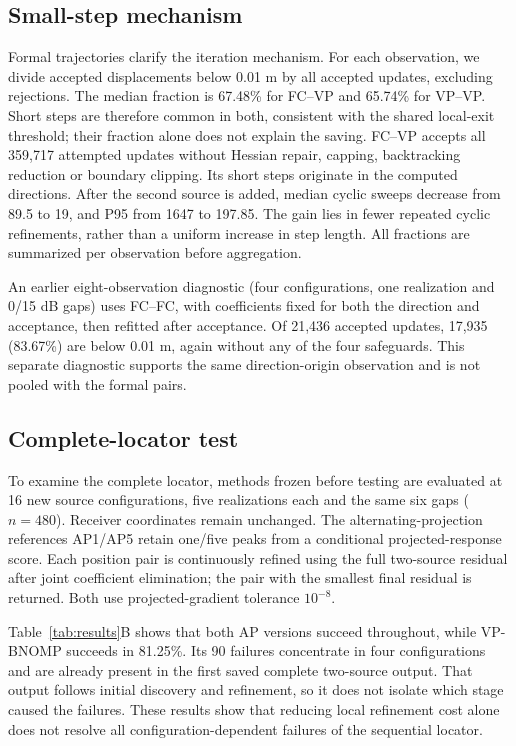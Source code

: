 \documentclass[a4paper,12pt,review]{cas-sc}
\begin{document}
\subsection{Small-step mechanism}
Formal trajectories clarify the iteration mechanism. For each observation, we divide accepted displacements below 0.01 m by all accepted updates, excluding rejections. The median fraction is 67.48\% for FC--VP and 65.74\% for VP--VP. Short steps are therefore common in both, consistent with the shared local-exit threshold; their fraction alone does not explain the saving. FC--VP accepts all 359,717 attempted updates without Hessian repair, capping, backtracking reduction or boundary clipping. Its short steps originate in the computed directions. After the second source is added, median cyclic sweeps decrease from 89.5 to 19, and P95 from 1647 to 197.85. The gain lies in fewer repeated cyclic refinements, rather than a uniform increase in step length. All fractions are summarized per observation before aggregation.

An earlier eight-observation diagnostic (four configurations, one realization and 0/15 dB gaps) uses FC--FC, with coefficients fixed for both the direction and acceptance, then refitted after acceptance. Of 21,436 accepted updates, 17,935 (83.67\%) are below 0.01 m, again without any of the four safeguards. This separate diagnostic supports the same direction-origin observation and is not pooled with the formal pairs.

\FloatBarrier
\subsection{Complete-locator test}
To examine the complete locator, methods frozen before testing are evaluated at 16 new source configurations, five realizations each and the same six gaps ($n=480$). Receiver coordinates remain unchanged. The alternating-projection references AP1/AP5 retain one/five peaks from a conditional projected-response score. Each position pair is continuously refined using the full two-source residual after joint coefficient elimination; the pair with the smallest final residual is returned. Both use projected-gradient tolerance $10^{-8}$.

Table~\ref{tab:results}B shows that both AP versions succeed throughout, while VP-BNOMP succeeds in 81.25\%. Its 90 failures concentrate in four configurations and are already present in the first saved complete two-source output. That output follows initial discovery and refinement, so it does not isolate which stage caused the failures. These results show that reducing local refinement cost alone does not resolve all configuration-dependent failures of the sequential locator.
\end{document}
